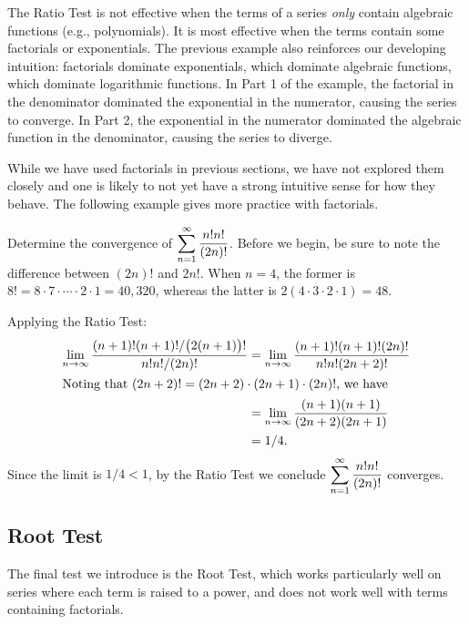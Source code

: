 The Ratio Test is not effective when the terms of a series \emph{only} contain algebraic functions (e.g., polynomials). It is most effective when the terms contain some factorials or exponentials. The previous example also reinforces our developing intuition: factorials dominate exponentials, which dominate algebraic functions, which dominate logarithmic functions. In Part 1 of the example, the factorial in the denominator dominated the exponential in the numerator, causing the series to converge. In Part 2, the exponential in the numerator dominated the algebraic function in the denominator, causing the series to diverge.

While we have used factorials in previous sections, we have not explored them closely and one is likely to not yet have a strong intuitive sense for how they behave. The following example gives more practice with factorials.

\begin{example}\label{ex_ratio2}%
Determine the convergence of $\displaystyle\sum_{n=1}^\infty \frac{n!n!}{(2n)!}$.
\solution
Before we begin, be sure to note the difference between $(2n)!$ and $2n!$. When $n=4$, the former is $8!=8\cdot7\cdot\dotsm\cdot 2\cdot1=40{,}320$, whereas the latter is $2(4\cdot3\cdot2\cdot1) = 48$.

Applying the Ratio Test:
\begin{align*}
	\lim_{n\to\infty} \frac{(n+1)!(n+1)!/\bigl(2(n+1)\bigr)!}{n!n!/(2n)!}
	&= \lim_{n\to\infty}\frac{(n+1)!(n+1)!(2n)!}{n!n!(2n+2)!}\\
\intertext{Noting that \((2n+2)! = (2n+2)\cdot(2n+1)\cdot(2n)!\), we have}
	&= \lim_{n\to\infty}\frac{(n+1)(n+1)}{(2n+2)(2n+1)}\\
	&= 1/4.
\end{align*}
Since the limit is $1/4<1$, by the Ratio Test we conclude $\displaystyle \sum_{n=1}^\infty \frac{n!n!}{(2n)!}$ converges.
\end{example}

\subsection{Root Test}

The final test we introduce is the Root Test, which works particularly well on series where each term is raised to a power, and does not work well with terms containing factorials. %



